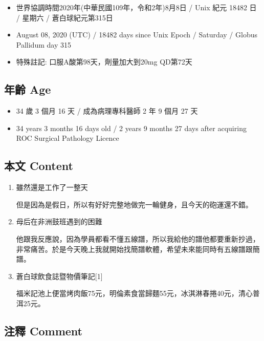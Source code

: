 \documentclass[a5paper, 11pt
]{book}
\providecommand{\tightlist}{%
  \setlength{\itemsep}{0pt}\setlength{\parskip}{0pt}}
\begin{document}
\begin{itemize}
\tightlist
\item
  世界協調時間2020年(中華民國109年，令和2年)8月8日 / Unix 紀元 18482 日
  / 星期六 / 蒼白球紀元第315日
\item
  August 08, 2020 (UTC) / 18482 days since Unix Epoch / Saturday /
  Globus Pallidum day 315
\item
  特殊註記: 口服A酸第98天，劑量加大到20mg QD第72天
\end{itemize}

\hypertarget{ux5e74ux9f61-age-59}{%
\subsection{年齡 Age}\label{ux5e74ux9f61-age-59}}

\begin{itemize}
\tightlist
\item
  34 歲 3 個月 16 天 / 成為病理專科醫師 2 年 9 個月 27 天
\item
  34 years 3 months 16 days old / 2 years 9 months 27 days after
  acquiring ROC Surgical Pathology Licence
\end{itemize}

\hypertarget{ux672cux6587-content-59}{%
\subsection{本文 Content}\label{ux672cux6587-content-59}}

\begin{enumerate}
\def\labelenumi{\arabic{enumi}.}
\item
  雖然還是工作了一整天

  但是因為是假日，所以有好好完整地做完一輪健身，且今天的砲運還不錯。
\item
  母后在非洲鼓班遇到的困難

  他跟我反應說，因為學員都看不懂五線譜，所以我給他的譜他都要重新抄過，非常痛苦。於是今天晚上我就開始找簡譜軟體，希望未來能同時有五線譜跟簡譜。
\item
  蒼白球飲食誌暨物價筆記{[}1{]}

  福米記池上便當烤肉飯75元，明倫素食當歸麵55元，冰淇淋春捲40元，清心普洱25元。
\end{enumerate}

\hypertarget{ux6ce8ux91cb-comment-59}{%
\subsection{注釋 Comment}\label{ux6ce8ux91cb-comment-59}}
\end{document}
